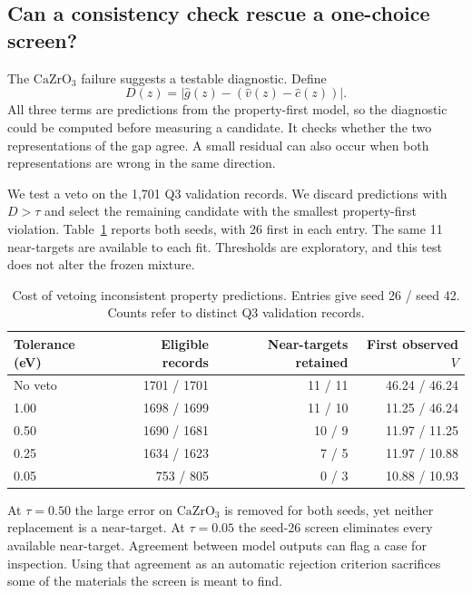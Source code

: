 \subsection{Can a consistency check rescue a one-choice screen?}
The $\mathrm{CaZrO_3}$ failure suggests a testable diagnostic. Define
\[
 D(z)=\big|\hat g(z)-(\hat v(z)-\hat c(z))\big|.
\]
All three terms are predictions from the property-first model, so the diagnostic could be computed before measuring a candidate. It checks whether the two representations of the gap agree. A small residual can also occur when both representations are wrong in the same direction.

We test a veto on the 1,701 Q3 validation records. We discard predictions with $D>\tau$ and select the remaining candidate with the smallest property-first violation. Table~\ref{tab:veto} reports both seeds, with 26 first in each entry. The same 11 near-targets are available to each fit. Thresholds are exploratory, and this test does not alter the frozen mixture.
\begin{table}[htbp]
\caption{Cost of vetoing inconsistent property predictions. Entries give seed 26 / seed 42. Counts refer to distinct Q3 validation records.}\label{tab:veto}
\centering\small\begin{tabular}{lrrr}
\toprule Tolerance (eV) & Eligible records & Near-targets retained & First observed $V$\\\midrule
No veto & 1701 / 1701 & 11 / 11 & 46.24 / 46.24\\
1.00 & 1698 / 1699 & 11 / 10 & 11.25 / 46.24\\
0.50 & 1690 / 1681 & 10 / 9 & 11.97 / 11.25\\
0.25 & 1634 / 1623 & 7 / 5 & 11.97 / 10.88\\
0.05 & 753 / 805 & 0 / 3 & 10.88 / 10.93\\\bottomrule
\end{tabular}
\end{table}

At $\tau=0.50$ the large error on $\mathrm{CaZrO_3}$ is removed for both seeds, yet neither replacement is a near-target. At $\tau=0.05$ the seed-26 screen eliminates every available near-target. Agreement between model outputs can flag a case for inspection. Using that agreement as an automatic rejection criterion sacrifices some of the materials the screen is meant to find.
